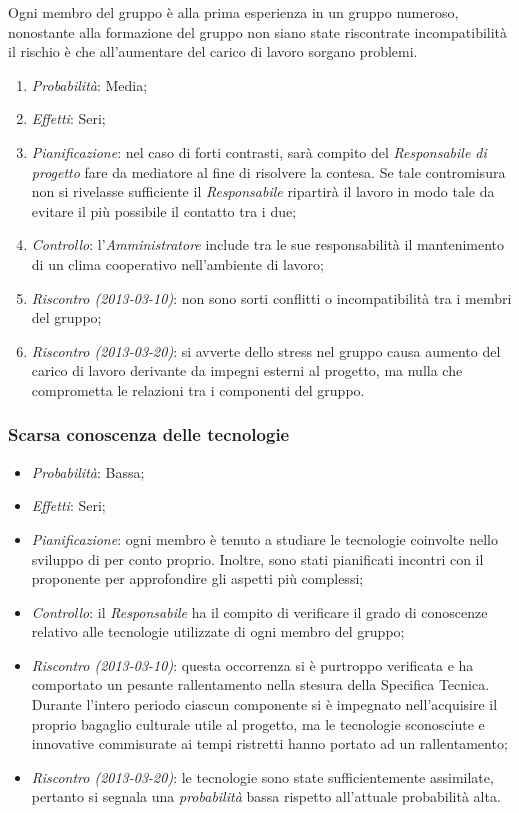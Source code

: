 Ogni membro del gruppo è alla prima esperienza in un gruppo numeroso, nonostante alla formazione del gruppo non siano state riscontrate incompatibilità il rischio è che all'aumentare del carico di lavoro sorgano problemi.		
\begin{enumerate}
\item \textit{Probabilità}: Media;
\item \textit{Effetti}: Seri;
\item \textit{Pianificazione}: nel caso di forti contrasti, sarà compito del \textit{Responsabile di progetto} fare da mediatore al fine di risolvere la contesa. Se tale contromisura non si rivelasse sufficiente il \textit{Responsabile} ripartirà il lavoro in modo tale da evitare il più possibile il contatto tra i due;
\item \textit{Controllo}: l'\textit{Amministratore} include tra le sue responsabilità il mantenimento di un clima cooperativo nell'ambiente di lavoro;
\item \textit{Riscontro (2013-03-10)}: non sono sorti conflitti o incompatibilità tra i membri del gruppo;
\item \textit{Riscontro (2013-03-20)}: si avverte dello stress nel gruppo causa aumento del carico di lavoro derivante da impegni esterni al progetto, ma nulla che comprometta le relazioni tra i componenti del gruppo.
\end{enumerate}	
		
		\subsubsection{Scarsa conoscenza delle tecnologie}
		
\begin{itemize}
\item \textit{Probabilità}: Bassa;
\item \textit{Effetti}: Seri;
\item \textit{Pianificazione}: ogni membro è tenuto a studiare le tecnologie coinvolte nello sviluppo di \ProjectName{} per conto proprio. Inoltre, sono stati pianificati incontri con il proponente per approfondire gli aspetti più complessi;
\item \textit{Controllo}: il \textit{Responsabile} ha il compito di verificare il grado di conoscenze relativo alle tecnologie utilizzate di ogni membro del gruppo;
\item \textit{Riscontro (2013-03-10)}: questa occorrenza si è purtroppo verificata e ha comportato un pesante rallentamento nella stesura della Specifica Tecnica. Durante l'intero periodo ciascun componente si è impegnato nell'acquisire il proprio bagaglio culturale utile al progetto, ma le tecnologie sconosciute e innovative commisurate ai tempi ristretti hanno portato ad un rallentamento;
\item \textit{Riscontro (2013-03-20)}: le tecnologie sono state sufficientemente assimilate, pertanto si segnala una \emph{probabilità} bassa rispetto all'attuale probabilità alta.
\end{itemize}	


